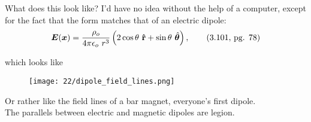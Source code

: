 \documentclass{article}
\numberwithin{equation}{section}
\newcommand{\rhat}{\mathbf{\hat{r}}}
\newcommand{\thetahat}{\skew{3}{\hat}{\skew{3}{}{\bm{\theta}}}}
\begin{document}
\vspace{0.5cm}

What does this look like? I'd have no idea without the help of a computer, except for the fact that the form matches that of an electric dipole:
\begin{equation}
    \bm{E}(\bm{x}) = \frac{\rho_o}{4\pi \epsilon_o\ r^3} \left( 2\cos{\theta}\ \rhat + \sin{\theta}\ \thetahat \right), \tag{3.101, pg. 78}
\end{equation}

which looks like

\begin{figure}[H]
    \centering
    \texttt{[image: 22/dipole\_field\_lines.png]}
    \label{fig:22:b}
\end{figure}

Or rather like the field lines of a bar magnet, everyone's first dipole. \\

The parallels between electric and magnetic dipoles are legion.
\end{document}
